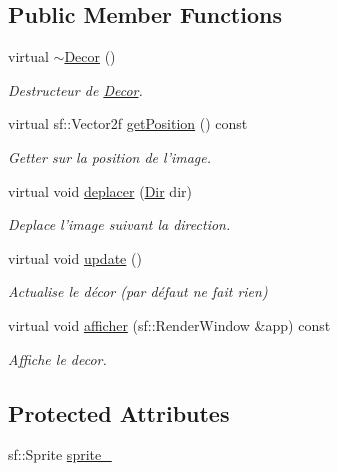 \subsection*{Public Member Functions}
\begin{DoxyCompactItemize}
\item 
\hypertarget{classDecor_a90ac8c0a3298f45ecd5c5ce1a173b61f}{virtual \hyperlink{classDecor_a90ac8c0a3298f45ecd5c5ce1a173b61f}{$\sim$\-Decor} ()}\label{classDecor_a90ac8c0a3298f45ecd5c5ce1a173b61f}

\begin{DoxyCompactList}\small\item\em Destructeur de \hyperlink{classDecor}{Decor}. \end{DoxyCompactList}\item 
virtual sf\-::\-Vector2f \hyperlink{classDecor_a43cd28cf51fa16db4530d1be4ee9332f}{get\-Position} () const 
\begin{DoxyCompactList}\small\item\em Getter sur la position de l'image. \end{DoxyCompactList}\item 
virtual void \hyperlink{classDecor_af152c75a4b5cae01a913b7bf1dfc70a5}{deplacer} (\hyperlink{Espace_8h_a7cf6e8c5a5bc5e7b2afef3647870b1c4}{Dir} dir)
\begin{DoxyCompactList}\small\item\em Deplace l'image suivant la direction. \end{DoxyCompactList}\item 
\hypertarget{classDecor_aa2912c2917a4ef51adb2834d3dcb606a}{virtual void \hyperlink{classDecor_aa2912c2917a4ef51adb2834d3dcb606a}{update} ()}\label{classDecor_aa2912c2917a4ef51adb2834d3dcb606a}

\begin{DoxyCompactList}\small\item\em Actualise le décor (par défaut ne fait rien) \end{DoxyCompactList}\item 
virtual void \hyperlink{classDecor_af6ed5812b421ada76d6121704a9a1de2}{afficher} (sf\-::\-Render\-Window \&app) const 
\begin{DoxyCompactList}\small\item\em Affiche le decor. \end{DoxyCompactList}\end{DoxyCompactItemize}
\subsection*{Protected Attributes}
\begin{DoxyCompactItemize}
\item 
sf\-::\-Sprite \hyperlink{classDecor_a380a2f079cc92f6d0ca9e5e151239efe}{sprite\-\_\-}
\end{DoxyCompactItemize}


